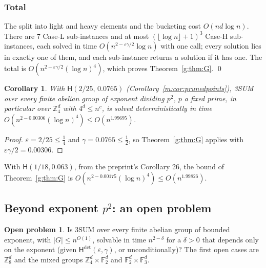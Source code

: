 \documentclass[11pt]{article}
\newtheorem{corollary}[theorem]{Corollary}
\theoremstyle{definition}
\newtheorem{problem}[theorem]{Open problem}
\theoremstyle{remark}
\newcommand{\Z}{\mathbb{Z}}
\newcommand{\F}{\mathbb{F}_2}
\newcommand{\eps}{\varepsilon}
\newcommand{\Hyp}{\mathsf{H}}
\newcommand{\HypPrunedEps}{2/25}%
\newcommand{\HypPrunedGamma}{0.0765}%
\newcommand{\EpsGammaBestHalf}{0.00306}%
\newcommand{\ExpHalfBestUp}{1.99695}%
\begin{document}
\subsubsection{Total}\label{g:sec:G:total}

The split into light and heavy elements and the bucketing cost $O(nd\log n)$. There are $7$ Case-L sub-instances and at most $(\lfloor\log n\rfloor+1)^3$ Case-H sub-instances, each solved in time $O(n^{2-\eps\gamma/2}\log n)$ with one call; every solution lies in exactly one of them, and each sub-instance returns a solution if it has one. The total is $O(n^{2-\eps\gamma/2}(\log n)^4)$, which proves Theorem~\ref{g:thm:G}. \qed

\begin{corollary}\label{g:cor:explicitG}
With $\Hyp(\HypPrunedEps,\,\HypPrunedGamma)$ (Corollary~\ref{m:cor:prunedpoints}), 3SUM over every finite abelian group of exponent dividing $p^2$, $p$ a fixed prime, in particular over $\Z_4^d$ with $4^d\le n^c$, is solved deterministically in time $O(n^{2-\EpsGammaBestHalf}(\log n)^4)\le O(n^{\ExpHalfBestUp})$.
\end{corollary}
\begin{proof}
$\eps=\HypPrunedEps\le\frac14$ and $\gamma=\HypPrunedGamma\le\frac12$, so Theorem~\ref{g:thm:G} applies with $\eps\gamma/2=\EpsGammaBestHalf$.
\end{proof}

With $\Hyp(1/18,0.063)$, from the preprint's Corollary 26, the bound of Theorem~\ref{g:thm:G} is $O(n^{2-0.00175}(\log n)^4)\le O(n^{1.99826})$.

\subsection{Beyond exponent \texorpdfstring{$p^2$}{p\^{}2}: an open problem}\label{g:sec:beyond}

\begin{problem}\label{g:prob:exponent}
Is 3SUM over every finite abelian group of bounded exponent, with $|G|\le n^{O(1)}$, solvable in time $n^{2-\delta}$ for a $\delta>0$ that depends only on the exponent (given $\Hyp^{\det}(\eps,\gamma)$, or unconditionally)? The first open cases are $\Z_8^d$ and the mixed groups $\Z_4^d\times\F^d$ and $\F^d\times\mathbb F_3^d$.
\end{problem}
\end{document}
